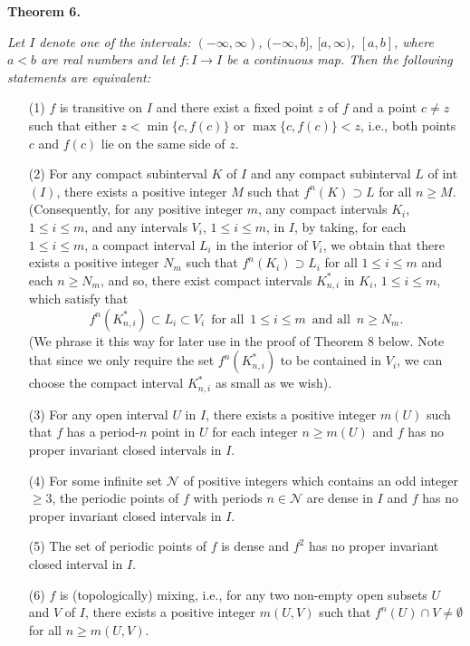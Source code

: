 \documentclass[12pt]{article}
\begin{document}
\noindent
{\bf Theorem 6.}
{\it Let $I$ denote one of the intervals: $(-\infty, \infty)$, $(-\infty, b]$, $[a, \infty)$, $[a, b]$, where $a < b$ are real numbers and let $f : I \rightarrow I$ be a continuous map.  Then the following statements are equivalent:
\begin{itemize}
\item[{\rm (1)}]
$f$ is transitive on $I$ and there exist a fixed point $z$ of $f$ and a point $c \ne z$ such that either $z < \min \big\{ c, f(c) \big\}$ or $\max \big\{ c, f(c) \big\} < z$, i.e., both points $c$ and $f(c)$ lie on the same side of $z$.  

\item[{\rm (2)}]
For any compact subinterval $K$ of $I$ and any compact subinterval $L$ of int$(I)$, there exists a positive integer $M$ such that $f^n(K) \supset L$ for all $n \ge M$.  \big(Consequently, for any positive integer $m$, any compact intervals $K_i$, $1 \le i \le m$, and any intervals $V_i$, $1 \le i \le m$, in $I$, by taking, for each $1 \le i \le m$, a compact interval $L_i$ in the interior of $V_i$, we obtain that there exists a positive integer $N_m$ such that $f^n(K_i) \supset L_i$ for all $1 \le i \le m$ and each $n \ge N_m$, and so, there exist compact intervals $K_{n,i}^*$ in $K_i$, $1 \le i \le m$, which satisfy that 
$$
f^n(K_{n,i}^*) \subset L_i \subset V_i \,\,\, \text{for all} \,\,\, 1 \le i \le m \,\,\, \text{and all} \,\,\, n \ge N_m.
$$
(We phrase it this way for later use in the proof of Theorem 8 below.  Note that since we only require the set $f^n(K_{n,i}^*)$ to be contained in $V_i$, we can choose the compact interval $K_{n,i}^*$ as small as we wish\big).

\item[{\rm (3)}]
For any open interval $U$ in $I$, there exists a positive integer $m(U)$ such that $f$ has a period-$n$ point in $U$ for each integer $n \ge m(U)$ and $f$ has no proper invariant closed intervals in $I$.

\item[{\rm (4)}]
For some infinite set $\mathcal N$ of positive integers which contains an odd integer $\ge 3$, the periodic points of $f$ with periods $n \in \mathcal N$ are dense in $I$ and $f$ has no proper invariant closed intervals in $I$. 

\item[{\rm (5)}]
The set of periodic points of $f$ is dense and $f^2$ has no proper invariant closed interval in $I$. 

\item[{\rm (6)}]
$f$ is (topologically) mixing, i.e., for any two non-empty open subsets $U$ and $V$ of $I$, there exists a positive integer $m(U, V)$ such that $f^n(U) \cap V \ne \emptyset$ for all $n \ge m(U, V)$.  
  

\end{itemize}}
\end{document}
